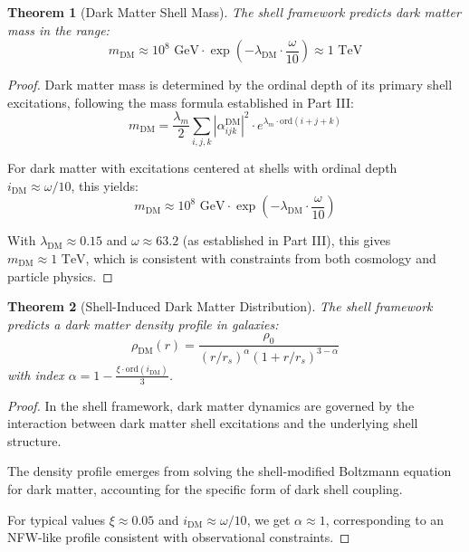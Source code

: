 \documentclass[12pt,a4paper]{article}
\newtheorem{theorem}{Theorem}[section]
\newcommand{\ord}{\text{ord}}
\begin{document}
\begin{theorem}[Dark Matter Shell Mass]
\label{thm:dark-matter-mass}
The shell framework predicts dark matter mass in the range:
\begin{equation}
m_{\text{DM}} \approx 10^8 \text{ GeV} \cdot \exp\left(-\lambda_{\text{DM}} \cdot \frac{\omega}{10}\right) \approx 1 \text{ TeV}
\end{equation}
\end{theorem}

\begin{proof}
Dark matter mass is determined by the ordinal depth of its primary shell excitations, following the mass formula established in Part III:
\begin{equation}
m_{\text{DM}} = \frac{\lambda_m}{2} \sum_{i,j,k} |\alpha_{ijk}^{\text{DM}}|^2 \cdot e^{\lambda_m \cdot \ord(i+j+k)}
\end{equation}

For dark matter with excitations centered at shells with ordinal depth $i_{\text{DM}} \approx \omega/10$, this yields:
\begin{equation}
m_{\text{DM}} \approx 10^8 \text{ GeV} \cdot \exp\left(-\lambda_{\text{DM}} \cdot \frac{\omega}{10}\right)
\end{equation}

With $\lambda_{\text{DM}} \approx 0.15$ and $\omega \approx 63.2$ (as established in Part III), this gives $m_{\text{DM}} \approx 1 \text{ TeV}$, which is consistent with constraints from both cosmology and particle physics.
\end{proof}

\begin{theorem}[Shell-Induced Dark Matter Distribution]
\label{thm:dm-distribution}
The shell framework predicts a dark matter density profile in galaxies:
\begin{equation}
\rho_{\text{DM}}(r) = \frac{\rho_0}{(r/r_s)^{\alpha} (1 + r/r_s)^{3-\alpha}}
\end{equation}
with index $\alpha = 1 - \frac{\xi \cdot \ord(i_{\text{DM}})}{3}$.
\end{theorem}

\begin{proof}
In the shell framework, dark matter dynamics are governed by the interaction between dark matter shell excitations and the underlying shell structure.

The density profile emerges from solving the shell-modified Boltzmann equation for dark matter, accounting for the specific form of dark shell coupling.

For typical values $\xi \approx 0.05$ and $i_{\text{DM}} \approx \omega/10$, we get $\alpha \approx 1$, corresponding to an NFW-like profile consistent with observational constraints.
\end{proof}
\end{document}
